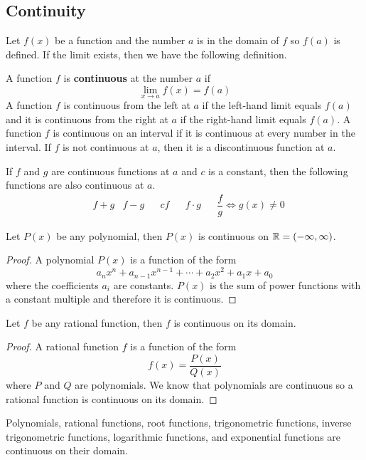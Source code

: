 \subsection{Continuity}
Let \(f(x)\) be a function and the number \(a\) is in the domain of \(f\) so
\(f(a)\) is defined.
If the limit exists, then we have the following definition.
\begin{definition}
    A function \(f\) is \textbf{continuous} at the number \(a\) if
    \[\lim_{x\to a}f(x)=f(a)\]
    A function \(f\) is continuous from the left at \(a\) if the left-hand limit
    equals \(f(a)\) and it is continuous from the right at \(a\) if the right-hand
    limit equals \(f(a)\).
    A function \(f\) is continuous on an interval if it is continuous
    at every number in the interval.
    If \(f\) is not continuous at \(a\), then it is a discontinuous function at \(a\).
\end{definition}
\begin{theorem}
    If \(f\) and \(g\) are continuous functions at \(a\) and \(c\) is a constant,
    then the following functions are also continuous at \(a\).
    \begin{align*}
        &f+g&f-g&&cf&&f\cdot g&&\dfrac{f}{g}\iff g(x)\neq 0
    \end{align*}
\end{theorem}
\begin{theorem}
    Let \(P(x)\) be any polynomial, then \(P(x)\) is continuous on
    \(\mathbb{R}=(-\infty,\infty)\).
\end{theorem}
\begin{proof}
    A polynomial \(P(x)\) is a function of the form
    \[a_nx^n+a_{n-1}x^{n-1}+\dotsb +a_{2}x^{2}+a_1x+a_0\]
    where the coefficients \(a_i\) are constants.
    \(P(x)\) is the sum of power functions with a constant multiple and
    therefore it is continuous.
\end{proof}
\begin{theorem}
    Let \(f\) be any rational function, then \(f\) is continuous on its domain.
\end{theorem}
\begin{proof}
    A rational function \(f\) is a function of the form
    \[f(x)=\frac{P(x)}{Q(x)}\] where \(P\) and \(Q\) are polynomials.
    We know that polynomials are continuous so a rational function is
    continuous on its domain.
\end{proof}
\begin{theorem}
    Polynomials, rational functions, root functions, trigonometric
    functions, inverse trigonometric functions, logarithmic functions, and
    exponential functions are continuous on their domain.
\end{theorem}
